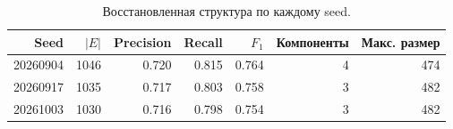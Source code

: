 \begin{table}[H]\centering
\small
\caption{Восстановленная структура по каждому seed.}
\begin{tabular}{@{}rrrrrrr@{}}\toprule
Seed & $|E|$ & Precision & Recall & $F_1$ & Компоненты & Макс. размер \\
\midrule
20260904 & 1046 & 0.720 & 0.815 & 0.764 & 4 & 474 \\
20260917 & 1035 & 0.717 & 0.803 & 0.758 & 3 & 482 \\
20261003 & 1030 & 0.716 & 0.798 & 0.754 & 3 & 482 \\
\bottomrule
\end{tabular}
\end{table}
